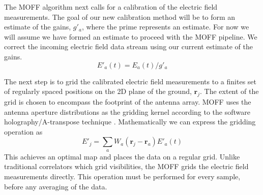 \documentclass[a4paper,fleqn,usenatbib]{mnras}
\begin{document}
The MOFF algorithm next calls for a calibration of the electric field measurements. The goal of our new calibration method will be 
to form an estimate of the gains, $g'_a$, where the prime represents an estimate. For now we will assume we have formed an estimate 
to proceed with the MOFF pipeline. We correct the incoming electric field data stream using our 
current estimate of the gains.
\begin{equation}
E'_a(t) = E_a(t)/ g'_a
\end{equation}

The next step is to grid the calibrated electric field measurements to a finites set of regularly spaced 
positions on the 2D plane of the ground, $\mathbf{r}_j$.
The extent of the grid is chosen to encompass the footprint of the antenna array.
MOFF uses the antenna aperture distributions as the gridding 
kernel according to the software holography/A-transpose technique \citep{mor09,bha08}. 
Mathematically we can express the gridding operation as
\begin{equation}
E'_j=\sum_a W_a(\mathbf{r}_j-\mathbf{r}_a) E'_a(t)
\end{equation}
This 
achieves an optimal map \citep{teg97b} and places the data on a regular grid. Unlike 
traditional correlators which grid visibilities, the MOFF grids the electric field measurements directly. This 
operation must be performed for every sample, before any averaging of the data.
\end{document}
